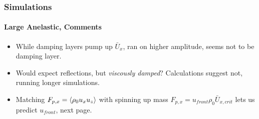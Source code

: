 \documentclass[dvipsnames, 10pt]{beamer}
\DeclarePairedDelimiter\ev{\langle}{\rangle}
\begin{document}
\begin{frame}
    \frametitle{Simulations}
    \framesubtitle{Large Anelastic, Comments}

    \begin{itemize}
        \item While damping layers pump up $\bar{U}_x$, ran on higher amplitude,
            seems not to be damping layer. %

        \item Would expect reflections, but \emph{viscously damped}?
            Calculations suggest not, running longer simulations.

        \item Matching $F_{p, x} = \ev*{\rho_0 u_x u_z}$ with spinning up mass
            $F_{p, x} = u_{front} \rho_0 \bar{U}_{x, crit}$ lets us predict
            $u_{front}$, next page.
    \end{itemize}
\end{frame}
\end{document}
